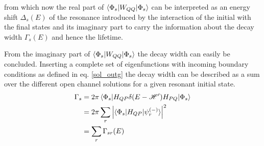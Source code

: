 from which now the real part of $\braket{\Phi_s|W_{QQ}|\Phi_s}$ can be interpreted 
as an energy shift $\Delta_s(E)$ of the resonance introduced by the interaction of the initial
with the final states and its imaginary part to carry the information about the
decay width $\Gamma_s(E)$ and hence the lifetime.


From the imaginary part of $\braket{\Phi_s|W_{QQ}|\Phi_s}$ the decay width can
easily be concluded. Inserting a complete set
of eigenfunctions with incoming boundary conditions as defined in
eq. \ref{sol_outg} the decay width can be described
as a sum over the different open channel solutions for a given resonant initial state.
\begin{align}
  \Gamma_s & = 2 \pi \braket{\Phi_s|H_{QP}\delta(E-\mathscr{H}')H_{PQ}|\Phi_s}   \label{equation:Gamma_HE}\\
           & = 2 \pi \sum\limits_r \left | \braket{\Phi_s|H_{QP}|\psi_r^{(-)}} \right|^2\\
           & = \sum\limits_r \Gamma_{sr}(E)
\end{align}
